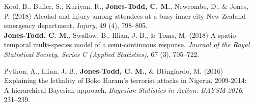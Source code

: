 \documentclass[10pt,a4paper]{moderncv}
\begin{document}
\vspace{-3pt}
Kool, B., Buller, S., Kuriyan, R., \textbf{Jones-Todd, C. M.}, Newcombe, D., \& Jones, P. (2018) Alcohol and injury among attendees at a busy inner city New Zealand emergency department. \textit{Injury}, 49 (4), 798--805.\\


  \textbf{Jones-Todd, C. M.}, Swallow, B., Illian, J. B., \& Toms, M. (2018) A spatio-temporal multi-species model of a semi-continuous response. \textit{Journal of the Royal Statistical Society, Series C (Applied Statistics)}, 67 (3), 705--722.\\
\vspace{5pt}

\vspace{-3pt}
Python, A.,  Illian, J. B., \textbf{Jones-Todd, C. M.}, \& Bl\'{a}ngiardo, M. (2016) Explaining the lethality of Boko Haram’s terrorist attacks in Nigeria, 2009-2014: A hierarchical Bayesian approach. \textit{Bayesian Statistics in Action: BAYSM 2016}, 231--239.\\









\end{document}
